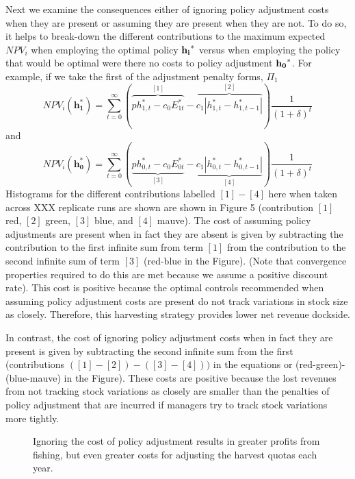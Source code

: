 \documentclass[12pt]{article}
\begin{document}
Next we examine the consequences either of ignoring policy adjustment costs when they are present or assuming they are present when they are not. To do so, it helps to break-down the different contributions to the maximum expected $NPV_i$ when employing the optimal policy $\bf{h_i}^*$ versus when employing the policy that would be optimal were there no costs to policy adjustment $\bf{h_0}^*$. For example, if we take the first of the adjustment penalty forms, $\Pi_1$
\begin{equation}
 NPV_i( \mathbf{h_1^*} ) = \sum_{t=0}^\infty (\overbrace{ p h^*_{1,t}-c_0E^*_{1t}}^{[1]}-\overbrace{c_1 | h^*_{1,t}- h^*_{1,t-1}|}^{[2]} ) \displaystyle \frac{1}{(1+\delta)^t}
\end{equation}
and 
\begin{equation}
 NPV_i( \mathbf{h_0^*} ) = \sum_{t=0}^\infty (\underbrace{ p h^*_{0,t}-c_0E^*_{0t}}_{[3]}-\underbrace{c_1 | h^*_{0,t}- h^*_{0,t-1}|}_{[4]} ) \displaystyle \frac{1}{(1+\delta)^t}
\end{equation}
Histograms for the different contributions labelled $[1]-[4]$ here when taken across XXX replicate runs are shown are shown in Figure 5 (contribution $[1]$ red, $[2]$ green, $[3]$ blue, and $[4]$ mauve). The cost of assuming policy adjustments are present when in fact they are absent is given by subtracting the contribution to the first infinite sum from term $[1]$ from the contribution to the second infinite sum of term $[3]$ (red-blue in the Figure). (Note that convergence properties required to do this are met because we assume a positive discount rate). This cost is positive because the optimal controls recommended when assuming policy adjustment costs are present do not track variations in stock size as closely. Therefore, this harvesting strategy provides lower net revenue dockside.

In contrast, the cost of ignoring policy adjustment costs when in fact they are present is given by subtracting the second infinite sum from the first (contributions $([1]-[2])-([3]-[4]))$ in the equations or (red-green)-(blue-mauve) in the Figure). These costs are positive because the lost revenues from not tracking stock variations as closely are smaller than the penalties of policy adjustment that are incurred if managers try to track stock variations more tightly.

\begin{figure}
\caption{Ignoring the cost of policy adjustment results in greater profits from fishing, but even greater costs for adjusting the harvest quotas each year.}
\end{figure}
\end{document}

